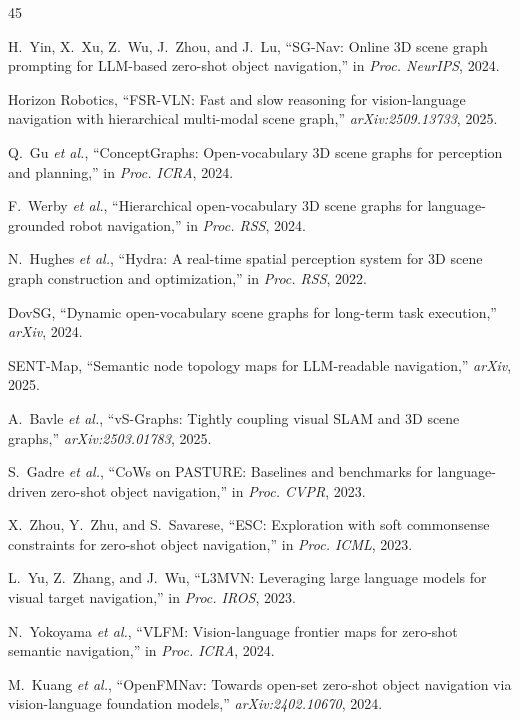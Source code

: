 \documentclass[conference]{IEEEtran}
\begin{document}
\begin{thebibliography}{45}

H.~Yin, X.~Xu, Z.~Wu, J.~Zhou, and J.~Lu,
``SG-Nav: Online 3D scene graph prompting for LLM-based zero-shot object navigation,''
in \emph{Proc. NeurIPS}, 2024.

Horizon Robotics,
``FSR-VLN: Fast and slow reasoning for vision-language navigation with hierarchical multi-modal scene graph,''
\emph{arXiv:2509.13733}, 2025.

Q.~Gu \emph{et al.},
``ConceptGraphs: Open-vocabulary 3D scene graphs for perception and planning,''
in \emph{Proc. ICRA}, 2024.

F.~Werby \emph{et al.},
``Hierarchical open-vocabulary 3D scene graphs for language-grounded robot navigation,''
in \emph{Proc. RSS}, 2024.

N.~Hughes \emph{et al.},
``Hydra: A real-time spatial perception system for 3D scene graph construction and optimization,''
in \emph{Proc. RSS}, 2022.

DovSG,
``Dynamic open-vocabulary scene graphs for long-term task execution,''
\emph{arXiv}, 2024.

SENT-Map,
``Semantic node topology maps for LLM-readable navigation,''
\emph{arXiv}, 2025.

A.~Bavle \emph{et al.},
``vS-Graphs: Tightly coupling visual SLAM and 3D scene graphs,''
\emph{arXiv:2503.01783}, 2025.

S.~Gadre \emph{et al.},
``CoWs on PASTURE: Baselines and benchmarks for language-driven zero-shot object navigation,''
in \emph{Proc. CVPR}, 2023.

X.~Zhou, Y.~Zhu, and S.~Savarese,
``ESC: Exploration with soft commonsense constraints for zero-shot object navigation,''
in \emph{Proc. ICML}, 2023.

L.~Yu, Z.~Zhang, and J.~Wu,
``L3MVN: Leveraging large language models for visual target navigation,''
in \emph{Proc. IROS}, 2023.

N.~Yokoyama \emph{et al.},
``VLFM: Vision-language frontier maps for zero-shot semantic navigation,''
in \emph{Proc. ICRA}, 2024.

M.~Kuang \emph{et al.},
``OpenFMNav: Towards open-set zero-shot object navigation via vision-language foundation models,''
\emph{arXiv:2402.10670}, 2024.


\end{thebibliography}
\end{document}
